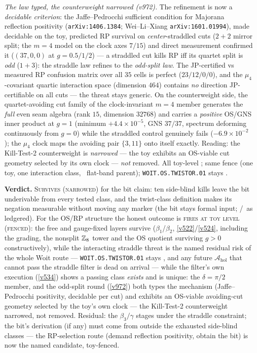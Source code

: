 \begin{gapbox}
\smallskip\noindent\emph{The law typed, the counterweight narrowed (v972).} The refinement is now a
\emph{decidable criterion}: the Jaffe--Pedrocchi sufficient condition for Majorana reflection
positivity (\texttt{arXiv:1406.1384}; Wei--Li--Xiang \texttt{arXiv:1601.01994}), made decidable on
the toy, predicted RP survival on \emph{center}-straddled cuts ($2{+}2$ mirror split; the $m=4$
model on the clock axes $7/15$) and direct measurement confirmed it ($(37,0,0)$ at $g=0.5/1/2$) ---
a straddled cut kills RP iff its quartet split is \emph{odd} ($1{+}3$): the straddle law refines to
the \emph{odd-split law}. The JP-certified vs measured RP confusion matrix over all $35$ cells is
perfect ($23/12/0/0$), and the $\mu_4$-covariant quartic interaction space (dimension $464$)
contains \emph{no} direction JP-certifiable on all cuts --- the threat stays generic. On the
counterweight side, the quartet-avoiding cut family of the clock-invariant $m=4$ member generates
the \emph{full} even seam algebra (rank $15$, dimension $32768$) and carries a \emph{positive}
OS/GNS inner product at $g=1$ (minimum $+4.4\times10^{-5}$, GNS $37/37$, spectrum deforming
continuously from $g=0$) while the straddled control genuinely fails ($-6.9\times10^{-2}$); the
$\mu_4$ clock maps the avoiding pair $\{3,11\}$ onto itself exactly. Reading: the Kill-Test-2
counterweight is \emph{narrowed} --- the toy exhibits an OS-viable cut geometry selected by its own
clock --- \emph{not} removed. All toy-level \mE; same fence (one toy, one interaction class, \mC\
flat-band parent); \texttt{WOIT.OS.TWISTOR.01} stays \mO.
\end{gapbox}

\noindent\textbf{Verdict.} \textsc{Survives (narrowed)} for the bit claim: ten side-blind kills
leave the bit underivable from every tested class, and the twist-class definition makes its
negation measurable without moving any marker (the bit stays formal input; \mC/\mO\ as ledgered).
For the OS/RP structure the honest outcome is \textsc{fires at toy level (fenced)}: the free and
gauge-fixed layers survive ($\beta_1$/$\beta_2$, \vref{v522}/\vref{v524}, including the grading,
the nonsplit $\mathbb{Z}_8$ tower and the OS quotient surviving $g>0$ constructively), while the
interacting straddle threat is the named residual risk of the whole Woit route ---
\texttt{WOIT.OS.TWISTOR.01} stays \mO, and any future $\mathcal A_{\mathrm{hol}}$ that cannot
pass the straddle filter is dead on arrival --- while the filter's own execution (\vref{v534})
shows a passing class \emph{exists} and is unique: the $\delta=\pi/2$ member, and the odd-split
round (\vref{v972}) both types the mechanism (Jaffe--Pedrocchi positivity, decidable per cut) and
exhibits an OS-viable avoiding-cut geometry selected by the toy's own clock --- the Kill-Test-2
counterweight narrowed, not removed. Residual: the
$\beta_3/\gamma$ stages under the straddle constraint; the bit's derivation (if any) must come
from outside the exhausted side-blind classes --- the RP-selection route (demand reflection
positivity, obtain the bit) is now the named candidate, toy-fenced.

